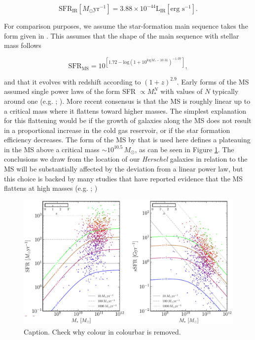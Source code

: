\begin{equation}
	\textrm{SFR}_{\textrm{IR}} [M_\odot\textrm{yr}^{-1}] = 3.88\times10^{-44}\textrm{L}_{\textrm{IR}} [\textrm{erg s}^{-1}].
	\label{eq:LIR_SFR_calibration}
\end{equation}

For comparison purposes, we assume the star-formation main sequence takes the form given in \citealt{Scoville_2017}. This assumes that the shape of the main sequence with stellar mass follows 

\begin{equation}
	\textrm{SFR}_{\textrm{MS}} = 10^{[1.72-\textrm{log}(1+10^{\textrm{log}M_*-10.31})^{-1.07}]},
	\label{eq:scoville_ms}
\end{equation}

\noindent and that it evolves with redshift according to $(1+z)^{2.9}$. Early forms of the MS assumed single power laws of the form SFR $\propto M_*^N$ with values of $N$ typically around one (e.g. \citealt{Daddi_2007}; \citealt{Elbaz_2007}). More recent consensus is that the MS is roughly linear up to a critical mass where it flattens toward higher masses. The simplest explanation for this flattening would be if the growth of galaxies along the MS does not result in a proportional increase in the cold gas reservoir, or if the star formation efficiency decreases. The form of the MS by \citealt{Scoville_2017} that is used here defines a plateauing in the MS above a critical mass $\sim 10^{10.5}\,M_\odot$, as can be seen in Figure \ref{fig:star_formation_ms}. The conclusions we draw from the location of our \textit{Herschel} galaxies in relation to the MS will be substantially affected by the deviation from a linear power law, but this choice is backed by many studies that have reported evidence that the MS flattens at high masses (e.g. \citealt{Magnelli_2014}; \citealt{Whitaker_2014})

\begin{figure}
	\centering
	\includegraphics[width=0.9\columnwidth]{Figures/star_formation_ms.pdf}
	\caption{{\color{red} Caption. Check why colour in colourbar is removed.}}
	\label{fig:star_formation_ms}
\end{figure}